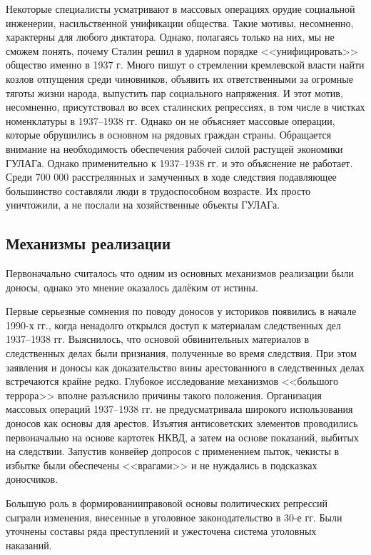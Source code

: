 \documentclass[12pt]{article}
\begin{document}
  Некоторые специалисты усматривают в массовых операциях орудие социальной инженерии, насильственной унификации общества.
  Такие мотивы, несомненно, характерны для любого диктатора.
  Однако, полагаясь только на них, мы не сможем понять, почему Сталин решил в ударном порядке <<унифицировать>> общество именно в 1937 г.
  Много пишут о стремлении кремлевской власти найти козлов отпущения среди чиновников, объявить их ответственными за огромные тяготы жизни народа, выпустить пар социального напряжения.
  И этот мотив, несомненно, присутствовал во всех сталинских репрессиях, в том числе в чистках номенклатуры в 1937--1938 гг.
  Однако он не объясняет массовые операции, которые обрушились в основном на рядовых граждан страны.
  Обращается внимание на необходимость обеспечения рабочей силой растущей экономики ГУЛАГа.
  Однако применительно к 1937--1938 гг. и это объяснение не работает.
  Среди 700 000 расстрелянных и замученных в ходе следствия подавляющее большинство составляли люди в трудоспособном возрасте.
  Их просто уничтожили, а не послали на хозяйственные объекты ГУЛАГа.

  \subsection{Механизмы реализации}
  Первоначально считалось что одним из основных механизмов реализации были доносы, однако это мнение оказалось далёким от истины.

  Первые серьезные сомнения по поводу доносов у историков появились в начале 1990-х гг.,
  когда ненадолго открылся доступ к материалам следственных дел 1937--1938 гг.
  Выяснилось, что основой обвинительных материалов в следственных делах были признания, полученные во время следствия.
  При этом заявления и доносы как доказательство вины арестованного в следственных делах встречаются крайне редко.
  Глубокое исследование механизмов <<большого террора>> вполне разъяснило причины такого положения.
  Организация массовых операций 1937--1938 гг. не предусматривала широкого использования доносов как основы для арестов.
  Изъятия антисоветских элементов проводились первоначально на основе картотек НКВД, а затем на основе показаний, выбитых на следствии.
  Запустив конвейер допросов с применением пыток, чекисты в избытке были обеспечены <<врагами>> и не нуждались в подсказках доносчиков.

  Большую роль в формированииправовой основы политических репрессий сыграли изменения, внесенные в уголовное законодательство в 30-е гг.
  Были уточнены составы ряда преступлений и ужесточена система уголовных наказаний.
\end{document}
